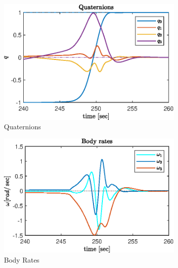 \begin{figure}[H]
    \centering
  \begin{subfigure}[b]{0.49\columnwidth}
     \centering
    \includegraphics[width=1\columnwidth]{figures/plots/CMG/cm_reg_w10_zoom_q.eps}
    \caption{Quaternions}
    \label{plt:cm_reg_w10_zoom_q}
\end{subfigure}
  \begin{subfigure}[b]{0.49\columnwidth}
     \centering
    \includegraphics[width=1\columnwidth]{figures/plots/CMG/cm_reg_w10_zoom_w.eps}
    \caption{Body Rates}
    \label{plt:cm_reg_w10_zoom_w}
\end{subfigure}
  \begin{subfigure}[b]{0.49\columnwidth}
     \centering

\end{subfigure}
\end{figure}
